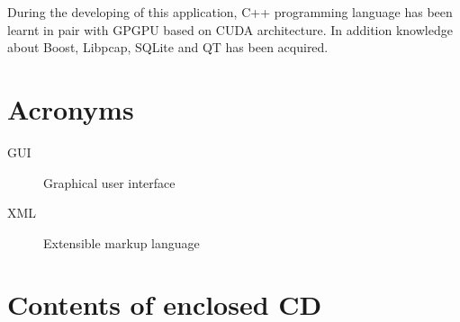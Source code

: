 \documentclass[thesis=M,english]{FITthesis}[2011/07/15]
\begin{document}
During the developing of this application, C++ programming language has been learnt in pair with GPGPU based on CUDA architecture. In addition knowledge about Boost, Libpcap, SQLite and QT has been acquired.




\appendix

\chapter{Acronyms}
\begin{description}
	\item[GUI] Graphical user interface
	\item[XML] Extensible markup language
\end{description}


\chapter{Contents of enclosed CD}
\end{document}

